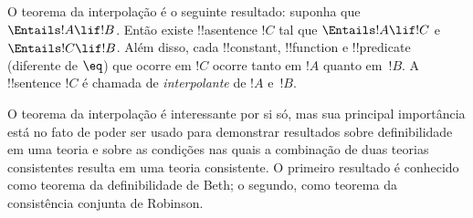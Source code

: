 \documentclass[../../../include/open-logic-section]{subfiles}
\begin{document}


O teorema da interpolação é o seguinte resultado: suponha que
$\Entails !A \lif !B$. Então existe !!a{sentence} $!C$ tal que
$\Entails !A \lif !C$ e $\Entails !C \lif !B$. Além disso, cada
!!{constant}, !!{function} e !!{predicate} (diferente de $\eq$) que ocorre em
$!C$ ocorre tanto em $!A$ quanto em~$!B$. A !!{sentence} $!C$ é chamada de
\emph{interpolante} de $!A$ e~$!B$.

O teorema da interpolação é interessante por si só, mas sua principal
importância está no fato de poder ser usado para demonstrar resultados sobre
definibilidade em uma teoria e sobre as condições nas quais a combinação de
duas teorias consistentes resulta em uma teoria consistente. O primeiro
resultado é conhecido como teorema da definibilidade de Beth; o segundo, como
teorema da consistência conjunta de Robinson.
\end{document}
